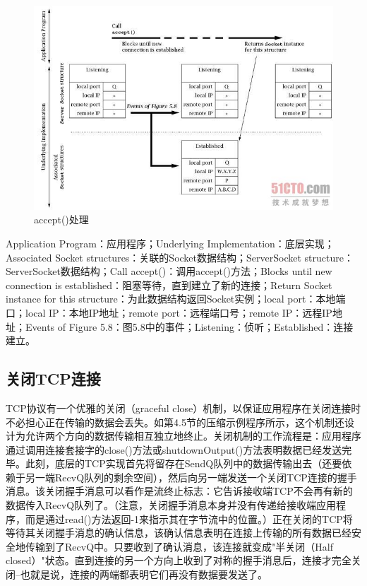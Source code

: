 		\begin{figure}[htbp]%
			\centering
			\includegraphics[scale=.6]{img/06.09.jpg}
			\caption{accept()处理}
			\label{fig:accept.process}
		\end{figure}

		Application Program：应用程序；Underlying Implementation：底层实现；Associated Socket structures：关联的Socket数据结构；ServerSocket structure：ServerSocket数据结构；Call accept()：调用accept()方法；Blocks until new connection is established：阻塞等待，直到建立了新的连接；Return Socket instance for this structure：为此数据结构返回Socket实例；local port：本地端口；local IP：本地IP地址；remote port：远程端口号；remote IP：远程IP地址；Events of Figure 5.8：图5.8中的事件；Listening：侦听；Established：连接建立。

	\subsection{关闭TCP连接}

		TCP协议有一个优雅的关闭（graceful close）机制，以保证应用程序在关闭连接时不必担心正在传输的数据会丢失。如第4.5节的压缩示例程序所示，这个机制还设计为允许两个方向的数据传输相互独立地终止。关闭机制的工作流程是：应用程序通过调用连接套接字的close()方法或shutdownOutput()方法表明数据已经发送完毕。此刻，底层的TCP实现首先将留存在SendQ队列中的数据传输出去（还要依赖于另一端RecvQ队列的剩余空间），然后向另一端发送一个关闭TCP连接的握手消息。该关闭握手消息可以看作是流终止标志：它告诉接收端TCP不会再有新的数据传入RecvQ队列了。（注意，关闭握手消息本身并没有传递给接收端应用程序，而是通过read()方法返回-1来指示其在字节流中的位置。）正在关闭的TCP将等待其关闭握手消息的确认信息，该确认信息表明在连接上传输的所有数据已经安全地传输到了RecvQ中。只要收到了确认消息，该连接就变成"半关闭（Half closed）"状态。直到连接的另一个方向上收到了对称的握手消息后，连接才完全关闭--也就是说，连接的两端都表明它们再没有数据要发送了。

